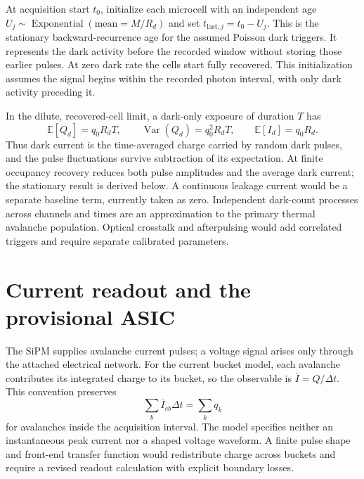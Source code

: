 \documentclass[11pt]{article}
\newcommand{\E}{\mathbb{E}}
\newcommand{\Var}{\operatorname{Var}}
\begin{document}
At acquisition start $t_0$, initialize each microcell with an independent age
$U_j\sim\operatorname{Exponential}(\text{mean}=M/R_d)$ and set
$t_{\mathrm{last},j}=t_0-U_j$. This is the stationary backward-recurrence
age for the assumed Poisson dark triggers. It represents the dark activity
before the recorded window without storing those earlier pulses. At zero
dark rate the cells start fully recovered. This initialization assumes the
signal begins within the recorded photon interval, with only dark activity
preceding it.

In the dilute, recovered-cell limit, a dark-only exposure of duration $T$
has
\begin{equation}
 \E[Q_d]=q_0R_dT,\qquad \Var(Q_d)=q_0^2R_dT,
 \qquad \E[I_d]=q_0R_d.
 \label{eq:dark-current}
\end{equation}
Thus dark current is the time-averaged charge carried by random dark pulses,
and the pulse fluctuations survive subtraction of its expectation. At finite
occupancy recovery reduces both pulse amplitudes and the average dark
current; the stationary result is derived below. A continuous leakage current
would be a separate baseline term, currently taken as zero. Independent
dark-count processes across channels and times are an approximation to the
primary thermal avalanche population. Optical crosstalk and afterpulsing
would add correlated triggers and require separate calibrated parameters.

\section{Current readout and the provisional ASIC}
The SiPM supplies avalanche current pulses; a voltage signal arises only
through the attached electrical network. For the current bucket model, each
avalanche contributes its integrated charge to its bucket, so the observable
is $\overline I=Q/\Delta t$. This convention preserves
\begin{equation}
 \sum_b \overline I_{cb}\Delta t=\sum_k q_k
 \label{eq:charge-preservation}
\end{equation}
for avalanches inside the acquisition interval. The model specifies neither
an instantaneous peak current nor a shaped voltage waveform. A finite pulse
shape and front-end transfer function would redistribute charge across
buckets and require a revised readout calculation with explicit boundary
losses.
\end{document}
